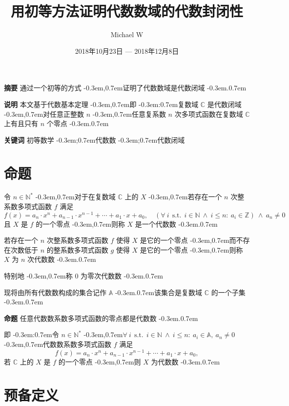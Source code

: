 \documentclass{article}
\title{用初等方法证明代数数域的代数封闭性}
\author{Michael W}
\date{2018年10月23日 --- 2018年12月8日}
\newcommand\InSetA[1]{\InSet{#1}{\MathSetA}}
\newcommand\InSetN[1]{\InSet{#1}{\MathSetN}}
\newcommand\InSetU[1]{\InSet{#1}{\MathSetU}}
\newcommand\InSetZ[1]{\InSet{#1}{\MathSetZ}}
\newcommand\MathSetA{\mathbb{A}}
\newcommand\MathSetC{\mathbb{C}}
\newcommand\MathSetN{\mathbb{N}}
\newcommand\MathSetU{\mathbb{N}^{*}}
\newcommand\MathSetZ{\mathbb{Z}}
\newcommand\Bracket[1]{\left( #1 \right)}
\newcommand\Colon{:}
\newcommand\Comma{,}
\newcommand\CommaAnd{\Space{\Comma}}
\newcommand\Domain[1]{\DomainComma \quad #1}
\newcommand\DomainAnd{\LogicAnd}
\newcommand\DomainComma{\Comma}
\newcommand\FlatPolynomial{a_{n} \cdot x^{n} + a_{n-1} \cdot x^{n-1} + \cdots + a_{1} \cdot x + a_{0}}
\newcommand\ForAll[3]{\Satisfy{\forall}{#1}{#2}{#3}}
\newcommand\Func[2]{#1 \Bracket{#2}}
\newcommand\InSet[2]{#1 \in #2}
\newcommand\Logic[1]{\ #1\ }
\newcommand\LogicAnd{\Logic{\wedge}}
\newcommand\NeqZero[1]{#1 \neq 0}
\newcommand\Satisfy[4]{\Space{#1} #2 \SuchThat #3 \Space{\Colon} #4}
\newcommand\Space[1]{#1\ }
\newcommand\SuchThat{\Logic{\Logic{\text{s.t.}}}}
\newcommand\EqEndComma{\Comma}
\newcommand\SubTitle[1]{\textbf{#1} \quad}
\newcommand\TextColon{\TextPunctuation{\Colon}}
\newcommand\TextComma{\TextPunctuation{\Comma}}
\newcommand\TextPeriod{\TextPunctuation{.}}
\newcommand\TextPunctuation[1]{\kern -0.3em#1\kern 0.7em}
\newcommand\TextSemicolon{\TextPunctuation{;}}
\begin{document}
	
	\maketitle
	
	\SubTitle{摘要} 通过一个初等的方式 \TextComma 证明了代数数域是代数闭域 \TextPeriod
	
	\SubTitle{说明} 本文基于代数基本定理 \TextComma 即 \TextColon 复数域 $\MathSetC$ 是代数闭域 \TextComma 对任意正整数 $n$ \TextComma 任意复系数 $n$ 次多项式函数在复数域 $\MathSetC$ 上有且只有 $n$ 个零点 \TextPeriod
	
	\SubTitle{关键词} 初等数学 \TextSemicolon 代数数 \TextSemicolon 代数闭域
	
	
	\section{命题} \label{sec:1}
	令 $\InSetU{n}$ \TextComma 对于在复数域 $\MathSetC$ 上的 $X$ \TextComma 若存在一个 $n$ 次整系数多项式函数 $f$ 满足
	\begin{equation*}
	\Func{f}{x} = \FlatPolynomial \Domain{\Bracket{\ForAll{i}{\InSetN{i} \LogicAnd i \leq n}{\InSetZ{a_{i}}}} \DomainAnd \NeqZero{a_{n}}}
	\end{equation*}
	且 $X$ 是 $f$ 的一个零点 \TextComma 则称 $X$ 是一个代数数 \TextPeriod
	
	若存在一个 $n$ 次整系数多项式函数 $f$ 使得 $X$ 是它的一个零点 \TextComma 而不存在次数低于 $n$ 的整系数多项式函数 $g$ 使得 $X$ 是它的一个零点 \TextComma 则称 $X$ 为 $n$ 次代数数 \TextPeriod
	
	特别地 \TextComma 称 $0$ 为零次代数数 \TextPeriod
	
	现将由所有代数数构成的集合记作 $\MathSetA$ \TextPeriod 该集合是复数域 $\MathSetC$ 的一个子集 \TextPeriod
	
	\SubTitle{命题} 任意代数数系数多项式函数的零点都是代数数 \TextPeriod
	
	即 \TextColon 令 $\InSetU{n}$ \TextComma $\ForAll{i}{\InSetN{i} \LogicAnd i \leq n}{\InSetA{a_{i}}} \CommaAnd \NeqZero{a_{n}}$ \TextComma 代数数系数多项式函数 $f$ 满足
	\begin{equation*}
	\Func{f}{x} = \FlatPolynomial \EqEndComma
	\end{equation*}
	若 $\MathSetC$ 上的 $X$ 是 $f$ 的一个零点 \TextComma 则 $X$ 为代数数 \TextPeriod
	
	
	\section{预备定义} \label{sec:2}
\end{document}
